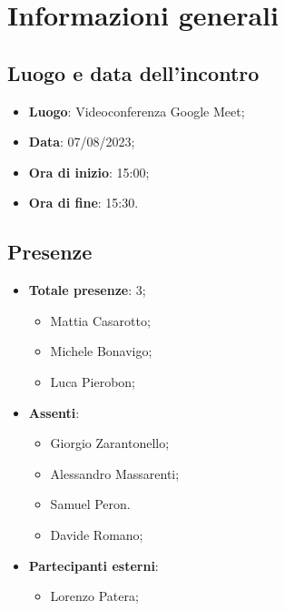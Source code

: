 \section{Informazioni generali}

    \subsection{Luogo e data dell'incontro}
    \begin{itemize}
        \item \textbf{Luogo}: Videoconferenza Google Meet;
        \item \textbf{Data}: 07/08/2023;
        \item \textbf{Ora di inizio}: 15:00;
        \item \textbf{Ora di fine}: 15:30.
    \end{itemize}
    \subsection{Presenze}
    \begin{itemize}
        \item \textbf{Totale presenze}: 3;
        \begin{itemize}
            \item Mattia Casarotto;
            \item Michele Bonavigo;
            \item Luca Pierobon;
        \end{itemize}
        \item \textbf{Assenti}:
        \begin{itemize}
            \item Giorgio Zarantonello;
            \item Alessandro Massarenti;
            \item Samuel Peron.
            \item Davide Romano;
        \end{itemize}
        \item \textbf{Partecipanti esterni}:
        \begin{itemize}
            \item Lorenzo Patera;
        \end{itemize}
    \end{itemize}